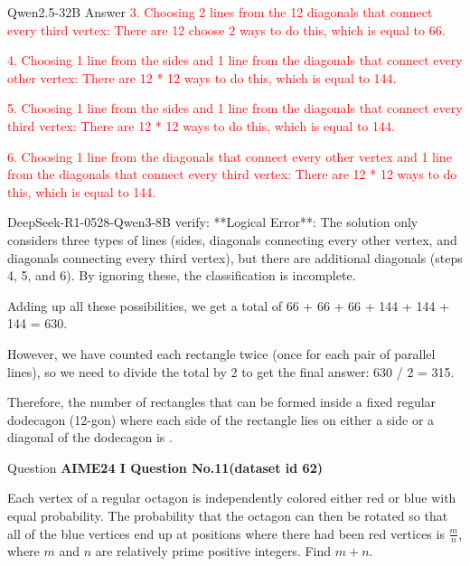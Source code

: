 \begin{answerbox}{Qwen2.5-32B Answer}
\textcolor{red}{3. Choosing 2 lines from the 12 diagonals that connect every third vertex: There are 12 choose 2 ways to do this, which is equal to 66.}

\textcolor{red}{4. Choosing 1 line from the sides and 1 line from the diagonals that connect every other vertex: There are 12 * 12 ways to do this, which is equal to 144.}

\textcolor{red}{5. Choosing 1 line from the sides and 1 line from the diagonals that connect every third vertex: There are 12 * 12 ways to do this, which is equal to 144.}

\textcolor{red}{6. Choosing 1 line from the diagonals that connect every other vertex and 1 line from the diagonals that connect every third vertex: There are 12 * 12 ways to do this, which is equal to 144.}

\begin{tcolorbox}[
    colback=blue!5!white,         %
    colframe=blue!40!white,       %
]
DeepSeek-R1-0528-Qwen3-8B verify:  **Logical Error**: The solution only considers three types of lines (sides, diagonals connecting every other vertex, and diagonals connecting every third vertex), but there are additional diagonals (steps 4, 5, and 6). By ignoring these, the classification is incomplete.
\end{tcolorbox}

Adding up all these possibilities, we get a total of 66 + 66 + 66 + 144 + 144 + 144 = 630.

However, we have counted each rectangle twice (once for each pair of parallel lines), so we need to divide the total by 2 to get the final answer: 630 / 2 = 315.

Therefore, the number of rectangles that can be formed inside a fixed regular dodecagon (12-gon) where each side of the rectangle lies on either a side or a diagonal of the dodecagon is .


\end{answerbox}


\begin{questionbox}{ Question }
\textbf{AIME24 I Question No.11(dataset id 62)}\footnotemark

Each vertex of a regular octagon is independently colored either red or blue with equal probability. The probability that the octagon can then be rotated so that all of the blue vertices end up at positions where there had been red vertices is $\tfrac{m}{n}$, where $m$ and $n$ are relatively prime positive integers. Find $m+n$.
\end{questionbox}

